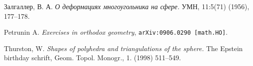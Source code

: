\documentclass{compositio}
\begin{document}
\begin{thebibliography}{52}
\begin{otherlanguage}{russian}
 Залгаллер, В. А.
\textit{О деформациях многоугольника на сфере.}
УМН, 11:5(71) (1956),  177--178.
\end{otherlanguage}

Petrunin A.
\emph{Exercises in orthodox geometry},
{\tt arXiv:0906.0290 [math.HO]}.

 Thurston, W. \textit{Shapes of polyhedra and triangulations of the sphere.} 
The Epstein birthday schrift,  Geom. Topol. Monogr., 1. (1998) 511--549.


\end{thebibliography}
\end{document}
